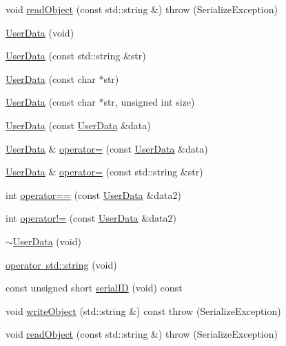 \begin{DoxyCompactItemize}
\item 
void \mbox{\hyperlink{classFILEDB_1_1UserData_a61ccded861bac4b772af2488a2cc7605}{read\+Object}} (const std\+::string \&)  throw (\+Serialize\+Exception)
\item 
\mbox{\hyperlink{classFILEDB_1_1UserData_ab92cdcf29a782d8d731752d12f849919}{User\+Data}} (void)
\item 
\mbox{\hyperlink{classFILEDB_1_1UserData_a47d70a4d9bce994d9ec79e30642120f0}{User\+Data}} (const std\+::string \&str)
\item 
\mbox{\hyperlink{classFILEDB_1_1UserData_ad0aaf29e2f7dcd413f9dca937422aeec}{User\+Data}} (const char $\ast$str)
\item 
\mbox{\hyperlink{classFILEDB_1_1UserData_a69798b639088b04fe01c685485d8c695}{User\+Data}} (const char $\ast$str, unsigned int size)
\item 
\mbox{\hyperlink{classFILEDB_1_1UserData_af66756abed6a8abf8d1e32aa93b5db68}{User\+Data}} (const \mbox{\hyperlink{classFILEDB_1_1UserData}{User\+Data}} \&data)
\item 
\mbox{\hyperlink{classFILEDB_1_1UserData}{User\+Data}} \& \mbox{\hyperlink{classFILEDB_1_1UserData_a27ceb819128358fb4384362b9f8440d1}{operator=}} (const \mbox{\hyperlink{classFILEDB_1_1UserData}{User\+Data}} \&data)
\item 
\mbox{\hyperlink{classFILEDB_1_1UserData}{User\+Data}} \& \mbox{\hyperlink{classFILEDB_1_1UserData_ab41f011c29fc6e394dbb1b960c7947b0}{operator=}} (const std\+::string \&str)
\item 
int \mbox{\hyperlink{classFILEDB_1_1UserData_a1ba93b241613cfbecceabb9bf1040d2e}{operator==}} (const \mbox{\hyperlink{classFILEDB_1_1UserData}{User\+Data}} \&data2)
\item 
int \mbox{\hyperlink{classFILEDB_1_1UserData_acfdc12e0f4dbc6faebe8bf89856fee8d}{operator!=}} (const \mbox{\hyperlink{classFILEDB_1_1UserData}{User\+Data}} \&data2)
\item 
\mbox{\hyperlink{classFILEDB_1_1UserData_a1db23ff452703be8b538fc0c5a39cad2}{$\sim$\+User\+Data}} (void)
\item 
\mbox{\hyperlink{classFILEDB_1_1UserData_a5e54144b7f24d68684ddc85e036d0605}{operator std\+::string}} (void)
\item 
const unsigned short \mbox{\hyperlink{classFILEDB_1_1UserData_a2d1cee48b497ef3f25957ecb1464b7f5}{serial\+ID}} (void) const
\item 
void \mbox{\hyperlink{classFILEDB_1_1UserData_a42b5e25b3cba7274363590c5b6861795}{write\+Object}} (std\+::string \&) const  throw (\+Serialize\+Exception)
\item 
void \mbox{\hyperlink{classFILEDB_1_1UserData_a61ccded861bac4b772af2488a2cc7605}{read\+Object}} (const std\+::string \&)  throw (\+Serialize\+Exception)
\end{DoxyCompactItemize}
